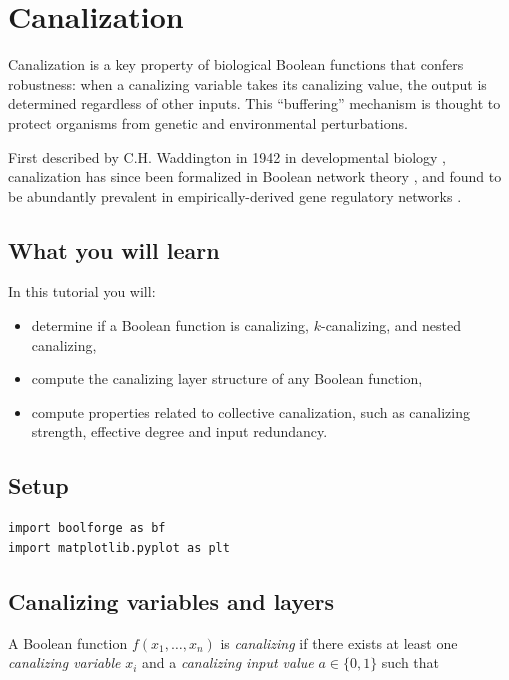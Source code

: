\documentclass[
]{article}
\providecommand{\tightlist}{%
  \setlength{\itemsep}{0pt}\setlength{\parskip}{0pt}}
\begin{document}
\section{Canalization}\label{canalization}

Canalization is a key property of biological Boolean functions that
confers robustness: when a canalizing variable takes its canalizing
value, the output is determined regardless of other inputs. This
``buffering'' mechanism is thought to protect organisms from genetic and
environmental perturbations.

First described by C.H. Waddington in 1942 in developmental biology
\citep{waddington1942canalization}, canalization has since been
formalized in Boolean network theory \citep{kauffman1974large}, and
found to be abundantly prevalent in empirically-derived gene regulatory
networks \citep{kadelka2024meta}.

\subsection{What you will learn}\label{what-you-will-learn-2}

In this tutorial you will:

\begin{itemize}
\tightlist
\item
  determine if a Boolean function is canalizing, \(k\)-canalizing, and
  nested canalizing,
\item
  compute the canalizing layer structure of any Boolean function,
\item
  compute properties related to collective canalization, such as
  canalizing strength, effective degree and input redundancy.
\end{itemize}

\subsection{Setup}\label{setup-2}

\begin{lstlisting}
import boolforge as bf
import matplotlib.pyplot as plt
\end{lstlisting}

\subsection{Canalizing variables and
layers}\label{canalizing-variables-and-layers}

A Boolean function \(f(x_1, \ldots, x_n)\) is \emph{canalizing} if there
exists at least one \emph{canalizing variable} \(x_i\) and a
\emph{canalizing input value} \(a \in \{0,1\}\) such that
\end{document}
